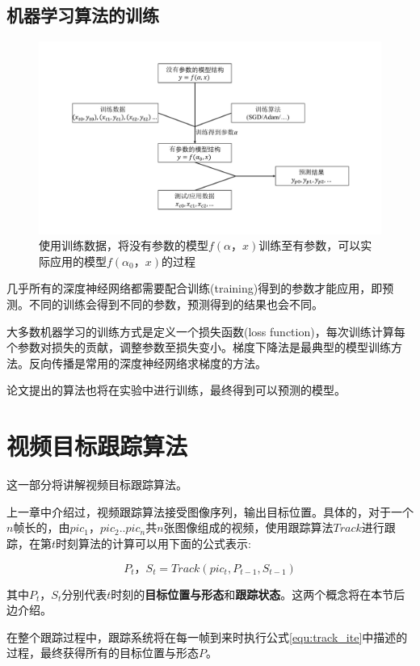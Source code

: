 \subsection{机器学习算法的训练}
\par
\begin{figure}[htbp!]
    \centering
    \includegraphics[width = 1.\textwidth]{chap/img/model_learning.pdf}
    \caption{使用训练数据，将没有参数的模型$f(\alpha，x)$训练至有参数，可以实际应用的模型$f(\alpha_0，x)$的过程}
    \label{fig:model_learning}
\end{figure}
几乎所有的深度神经网络都需要配合训练(training)得到的参数才能应用，即预测。不同的训练会得到不同的参数，预测得到的结果也会不同。
\par
大多数机器学习的训练方式是定义一个损失函数(loss function)，每次训练计算每个参数对损失的贡献，调整参数至损失变小。梯度下降法是最典型的模型训练方法。反向传播是常用的深度神经网络求梯度的方法。
\par
论文提出的算法也将在实验中进行训练，最终得到可以预测的模型。

\section{视频目标跟踪算法}
这一部分将讲解视频目标跟踪算法。
\par
上一章中介绍过，视频跟踪算法接受图像序列，输出目标位置。具体的，对于一个$n$帧长的，由$pic_1，pic_2..pic_n$共$n$张图像组成的视频，使用跟踪算法$Track$进行跟踪，在第$t$时刻算法的计算可以用下面的公式表示:
\par
\begin{equation}\label{equ:track_ite}  P_t，S_t=Track(pic_{t},P_{t-1},S_{t-1})  \end{equation}
\par
其中$P_t$，$S_t$分别代表$t$时刻的\textbf{目标位置与形态}和\textbf{跟踪状态}。这两个概念将在本节后边介绍。
\par
在整个跟踪过程中，跟踪系统将在每一帧到来时执行公式\ref{equ:track_ite}中描述的过程，最终获得所有的目标位置与形态$P$。
\par
